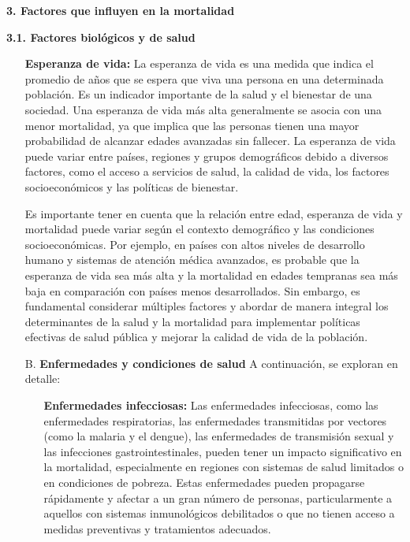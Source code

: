 \documentclass[8pt,a4paper]{beamer}
\begin{document}
{\begin{frame}{\textbf{3. Factores que influyen en la mortalidad}}
\begin{block}{\textbf{3.1. Factores biológicos y de salud}}
\begin{enumerate}
\begin{enumerate}
\item[\ding{99}] \textbf{Esperanza de vida:} La esperanza de vida es una medida que indica el promedio de años que se espera que viva una persona en una determinada población. Es un indicador importante de la salud y el bienestar de una sociedad. Una esperanza de vida más alta generalmente se asocia con una menor mortalidad, ya que implica que las personas tienen una mayor probabilidad de alcanzar edades avanzadas sin fallecer. La esperanza de vida puede variar entre países, regiones y grupos demográficos debido a diversos factores, como el acceso a servicios de salud, la calidad de vida, los factores socioeconómicos y las políticas de bienestar.
\end{enumerate}
\end{enumerate}
\end{block}
\end{frame}

\begin{frame}{}
\setlength{\parskip}{3px}
\justifying
\begin{block}{}
\setlength{\parskip}{3px}
\justifying
\begin{enumerate}
\setlength{\parskip}{3px}
\justifying
\item[{}] Es importante tener en cuenta que la relación entre edad, esperanza de vida y mortalidad puede variar según el contexto demográfico y las condiciones socioeconómicas. Por ejemplo, en países con altos niveles de desarrollo humano y sistemas de atención médica avanzados, es probable que la esperanza de vida sea más alta y la mortalidad en edades tempranas sea más baja en comparación con países menos desarrollados. Sin embargo, es fundamental considerar múltiples factores y abordar de manera integral los determinantes de la salud y la mortalidad para implementar políticas efectivas de salud pública y mejorar la calidad de vida de la población.

\item[B.] \textbf{Enfermedades y condiciones de salud} A continuación, se exploran en detalle:

\begin{enumerate}
\setlength{\parskip}{3px}
\justifying
\item[\ding{99}] \textbf{Enfermedades infecciosas:} Las enfermedades infecciosas, como las enfermedades respiratorias, las enfermedades transmitidas por vectores (como la malaria y el dengue), las enfermedades de transmisión sexual y las infecciones gastrointestinales, pueden tener un impacto significativo en la mortalidad, especialmente en regiones con sistemas de salud limitados o en condiciones de pobreza. Estas enfermedades pueden propagarse rápidamente y afectar a un gran número de personas, particularmente a aquellos con sistemas inmunológicos debilitados o que no tienen acceso a medidas preventivas y tratamientos adecuados.


\end{enumerate}
\end{enumerate}
\end{block}
\end{frame}}
\end{document}
